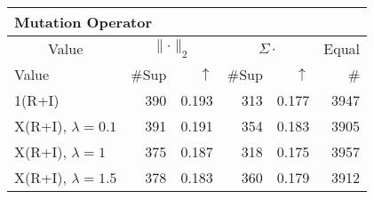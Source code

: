 \begin{center}
\renewcommand{\tabcolsep}{4pt}
\renewcommand{\arraystretch}{1.1}
\begin{customnormal}
\begin{tabular}{lrrrrr}
\multicolumn{6}{l}{Mutation Operator}\\
\toprule
\multicolumn{1}{c}{Value} & \multicolumn{2}{c}{$\lVert \cdot \rVert_2$} & \multicolumn{2}{c}{$\Sigma \cdot$} & \multicolumn{1}{c}{Equal} \\ 
\cmidrule(lr){1-1} \cmidrule(lr){2-3} \cmidrule(lr){4-5}  \cmidrule(lr){6-6}
Value & \#Sup & $\uparrow$ & \#Sup & $\uparrow$ & \# \\ 
\midrule
1(R+I) & 390 & 0.193 & 313 & 0.177 & 3947 \\ 
X(R+I), $\lambda=0.1$ & 391 & 0.191 & 354 & 0.183 & 3905 \\ 
X(R+I), $\lambda=1$ & 375 & 0.187 & 318 & 0.175 & 3957 \\ 
X(R+I), $\lambda=1.5$ & 378 & 0.183 & 360 & 0.179 & 3912 \\ 
\bottomrule
\end{tabular}


\end{customnormal}
\end{center}
